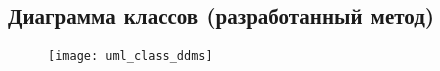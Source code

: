 \begin{landscape}
\chapter{Диаграмма классов (разработанный метод)}
\label{app:UML:Class:DDMS}
\begin{figure}[H]
\texttt{[image: uml\_class\_ddms]}
\end{figure}
\end{landscape}